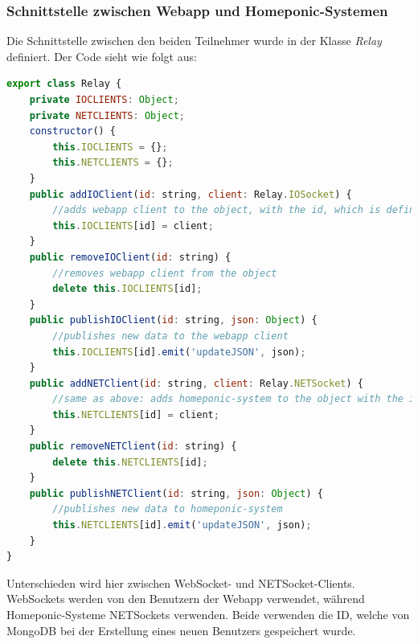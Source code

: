 \subsubsection{Schnittstelle zwischen Webapp und Homeponic-Systemen}
Die Schnittstelle zwischen den beiden Teilnehmer wurde in der Klasse \textit{Relay} definiert. Der Code sieht wie folgt aus:
\lstset{escapechar=?,style=customjava}
\begin{lstlisting}[language=javascript, caption=Kommunikation zwischen Webapp und Homeponic-System - Relay Klasse]
export class Relay {
    private IOCLIENTS: Object;
    private NETCLIENTS: Object;
    constructor() {
        this.IOCLIENTS = {};
        this.NETCLIENTS = {};
    }
    public addIOClient(id: string, client: Relay.IOSocket) {
        //adds webapp client to the object, with the id, which is defined from MongoDB
        this.IOCLIENTS[id] = client;
    }
    public removeIOClient(id: string) {
        //removes webapp client from the object
        delete this.IOCLIENTS[id];
    }
    public publishIOClient(id: string, json: Object) {
        //publishes new data to the webapp client
        this.IOCLIENTS[id].emit('updateJSON', json);
    }
    public addNETClient(id: string, client: Relay.NETSocket) {
        //same as above: adds homeponic-system to the object with the id defined from MongoDB 
        this.NETCLIENTS[id] = client;
    }
    public removeNETClient(id: string) {
        delete this.NETCLIENTS[id];
    }
    public publishNETClient(id: string, json: Object) {
        //publishes new data to homeponic-system
        this.NETCLIENTS[id].emit('updateJSON', json);
    }
}
\end{lstlisting}
\lstset{escapechar=@,style=customjava}
Unterschieden wird hier zwischen WebSocket- und NETSocket-Clients. WebSockets werden von den Benutzern der Webapp verwendet, während Homeponic-Systeme NETSockets verwenden. Beide verwenden die ID, welche von MongoDB bei der Erstellung eines neuen Benutzers gespeichert wurde.
\newpage
\blankpage
